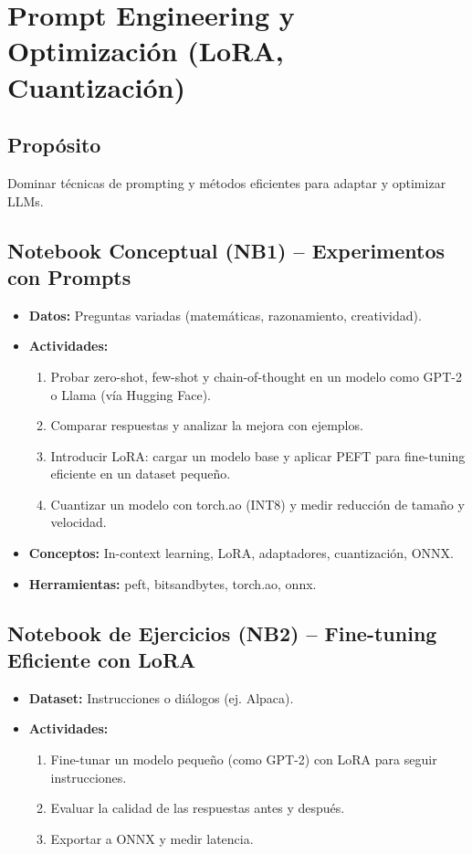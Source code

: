 \documentclass[12pt,a4paper]{article}
\begin{document}
\section{Prompt Engineering y Optimización (LoRA, Cuantización)}
\subsection*{Propósito}
Dominar técnicas de prompting y métodos eficientes para adaptar y optimizar LLMs.

\subsection*{Notebook Conceptual (NB1) – Experimentos con Prompts}
\begin{itemize}
    \item \textbf{Datos:} Preguntas variadas (matemáticas, razonamiento, creatividad).
    \item \textbf{Actividades:}
    \begin{enumerate}
        \item Probar zero-shot, few-shot y chain-of-thought en un modelo como GPT-2 o Llama (vía Hugging Face).
        \item Comparar respuestas y analizar la mejora con ejemplos.
        \item Introducir LoRA: cargar un modelo base y aplicar PEFT para fine-tuning eficiente en un dataset pequeño.
        \item Cuantizar un modelo con torch.ao (INT8) y medir reducción de tamaño y velocidad.
    \end{enumerate}
    \item \textbf{Conceptos:} In-context learning, LoRA, adaptadores, cuantización, ONNX.
    \item \textbf{Herramientas:} peft, bitsandbytes, torch.ao, onnx.
\end{itemize}

\subsection*{Notebook de Ejercicios (NB2) – Fine-tuning Eficiente con LoRA}
\begin{itemize}
    \item \textbf{Dataset:} Instrucciones o diálogos (ej. Alpaca).
    \item \textbf{Actividades:}
    \begin{enumerate}
        \item Fine-tunar un modelo pequeño (como GPT-2) con LoRA para seguir instrucciones.
        \item Evaluar la calidad de las respuestas antes y después.
        \item Exportar a ONNX y medir latencia.
    \end{enumerate}
\end{itemize}
\end{document}
